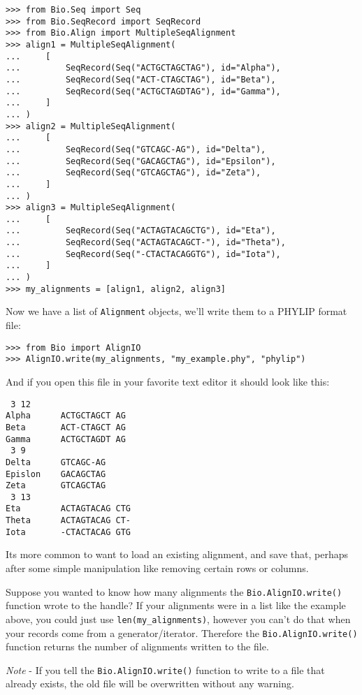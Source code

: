 \begin{verbatim}
>>> from Bio.Seq import Seq
>>> from Bio.SeqRecord import SeqRecord
>>> from Bio.Align import MultipleSeqAlignment
>>> align1 = MultipleSeqAlignment(
...     [
...         SeqRecord(Seq("ACTGCTAGCTAG"), id="Alpha"),
...         SeqRecord(Seq("ACT-CTAGCTAG"), id="Beta"),
...         SeqRecord(Seq("ACTGCTAGDTAG"), id="Gamma"),
...     ]
... )
>>> align2 = MultipleSeqAlignment(
...     [
...         SeqRecord(Seq("GTCAGC-AG"), id="Delta"),
...         SeqRecord(Seq("GACAGCTAG"), id="Epsilon"),
...         SeqRecord(Seq("GTCAGCTAG"), id="Zeta"),
...     ]
... )
>>> align3 = MultipleSeqAlignment(
...     [
...         SeqRecord(Seq("ACTAGTACAGCTG"), id="Eta"),
...         SeqRecord(Seq("ACTAGTACAGCT-"), id="Theta"),
...         SeqRecord(Seq("-CTACTACAGGTG"), id="Iota"),
...     ]
... )
>>> my_alignments = [align1, align2, align3]
\end{verbatim}

\noindent Now we have a list of \verb|Alignment| objects, we'll write them to a PHYLIP format file:

\begin{verbatim}
>>> from Bio import AlignIO
>>> AlignIO.write(my_alignments, "my_example.phy", "phylip")
\end{verbatim}

\noindent And if you open this file in your favorite text editor it should look like this:

\begin{verbatim}
 3 12
Alpha      ACTGCTAGCT AG
Beta       ACT-CTAGCT AG
Gamma      ACTGCTAGDT AG
 3 9
Delta      GTCAGC-AG
Epislon    GACAGCTAG
Zeta       GTCAGCTAG
 3 13
Eta        ACTAGTACAG CTG
Theta      ACTAGTACAG CT-
Iota       -CTACTACAG GTG
\end{verbatim}

Its more common to want to load an existing alignment, and save that, perhaps after some simple manipulation like removing certain rows or columns.

Suppose you wanted to know how many alignments the \verb|Bio.AlignIO.write()| function wrote to the handle? If your alignments were in a list like the example above, you could just use \verb|len(my_alignments)|, however you can't do that when your records come from a generator/iterator.  Therefore the \verb|Bio.AlignIO.write()| function returns the number of alignments written to the file.

\emph{Note} - If you tell the \verb|Bio.AlignIO.write()| function to write to a file that already exists, the old file will be overwritten without any warning.


